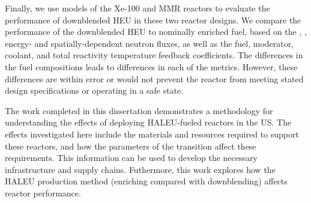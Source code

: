 Finally, we use models of the Xe-100 and \gls{MMR} reactors to 
evaluate the performance of downblended \gls{HEU} in these 
two reactor designs. We compare the performance of the downblended 
\gls{HEU} to nominally enriched fuel, based on the 
\keff, \betaEff, energy- and spatially-dependent neutron 
fluxes, as well as the fuel, moderator, coolant, and total reactivity 
temperature feedback coefficients. The differences in the fuel 
compositions leads to differences in each of the metrics. 
However, these differences are within error or would not prevent the 
reactor from meeting stated design specifications or operating 
in a safe state. 

The work completed in this dissertation demonstrates a methodology for 
understanding the effects of deploying \gls{HALEU}-fueled reactors 
in the US. The effects investigated here include the materials and 
resources required to support these reactors, and how the 
parameters of the transition affect these requirements. This 
information can be used to develop the necessary infrastructure 
and supply chains. Futhermore, this work explores how the 
\gls{HALEU} production method (enriching compared with downblending)
affects reactor performance. 
